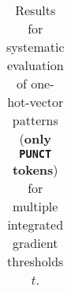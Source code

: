 \begin{table}[t]
\begin{tabular}{lllllll}

\hline
\end{tabular}
\caption[Model Evaluation for only \texttt{PUNCT} tokens]{Results for systematic evaluation of one-hot-vector patterns (\textbf{only \texttt{PUNCT} tokens}) for multiple integrated gradient thresholds $t$.}
\label{tab:evalResultsPUNCT}
\end{table}
	